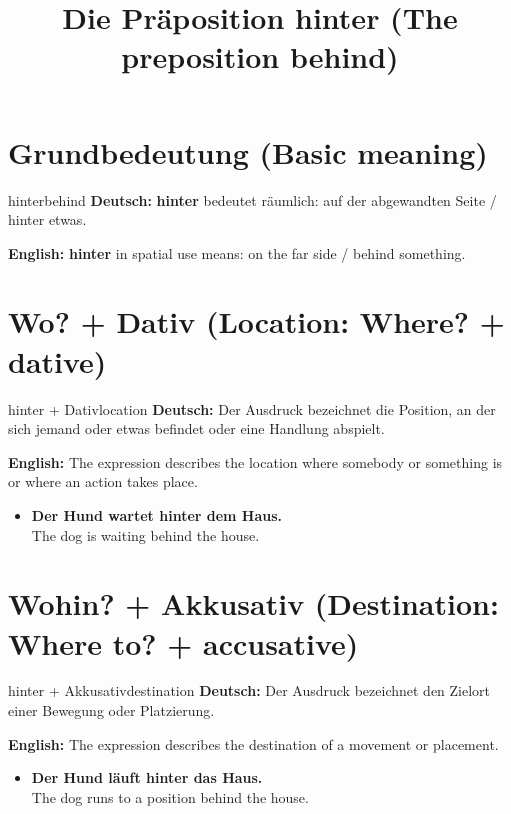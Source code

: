 \documentclass[a4paper,11pt]{article}
\title{Die Präposition hinter (The preposition behind)}
\date{}
\newcommand{\GermanText}[1]{\textbf{Deutsch: }#1\par}
\newcommand{\EnglishText}[1]{{\small\color{SoftGray}\textbf{English: }#1\par}}
\newcommand{\ExampleItem}[2]{\item \textbf{#1}\\{\small\color{SoftGray}#2}}
\begin{document}
\maketitle
\tableofcontents
\newpage
\section{Grundbedeutung (Basic meaning)}
\begin{grammarentry}{hinter}{behind}
\GermanText{\textbf{hinter} bedeutet räumlich: auf der abgewandten Seite / hinter etwas.}
\EnglishText{\textbf{hinter} in spatial use means: on the far side / behind something.}
\end{grammarentry}
\section{Wo? + Dativ (Location: Where? + dative)}
\begin{grammarentry}{hinter + Dativ}{location}
\GermanText{Der Ausdruck bezeichnet die Position, an der sich jemand oder etwas befindet oder eine Handlung abspielt.}
\EnglishText{The expression describes the location where somebody or something is or where an action takes place.}
\end{grammarentry}
\begin{exbox}
\begin{itemize}
\ExampleItem{Der Hund wartet hinter dem Haus.}{The dog is waiting behind the house.}
\end{itemize}
\end{exbox}
\section{Wohin? + Akkusativ (Destination: Where to? + accusative)}
\begin{grammarentry}{hinter + Akkusativ}{destination}
\GermanText{Der Ausdruck bezeichnet den Zielort einer Bewegung oder Platzierung.}
\EnglishText{The expression describes the destination of a movement or placement.}
\end{grammarentry}
\begin{exbox}
\begin{itemize}
\ExampleItem{Der Hund läuft hinter das Haus.}{The dog runs to a position behind the house.}
\end{itemize}
\end{exbox}
\end{document}
